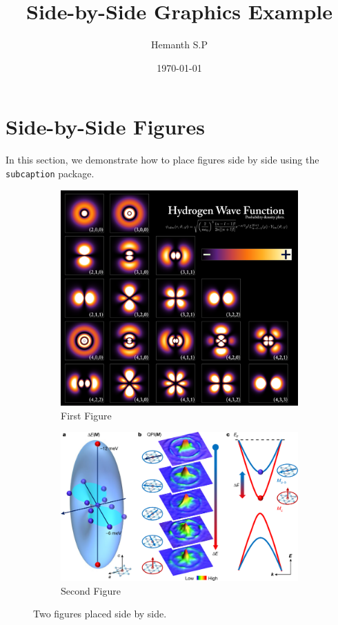 \documentclass[a4paper, 12pt]{article}
\begin{document}
\title{Side-by-Side Graphics Example}
\author{Hemanth S.P} %
\date{\today}
\maketitle
\section{Side-by-Side Figures}
In this section, we demonstrate how to place figures side by side using the \texttt{subcaption} package.
\begin{figure}[h!]
\centering
\begin{subfigure}[b]{0.45\textwidth}
\centering
\includegraphics[width=\textwidth]{figure1.png} %
\caption{First Figure}
\label{fig:fig1}
\end{subfigure}
\hfill
\begin{subfigure}[b]{0.45\textwidth}
\centering
\includegraphics[width=\textwidth]{figure2.png} %
\caption{Second Figure}
\label{fig:fig2}
\end{subfigure}
\caption{Two figures placed side by side.}
\label{fig:sidebyside}
\end{figure}
\end{document}
